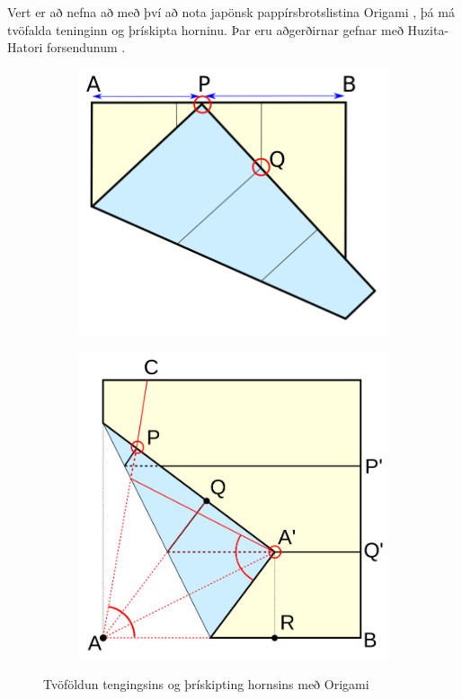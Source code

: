 \begin{frame}
  Vert er að nefna að með því að nota japönsk pappírsbrotslistina
  Origami \cite{WikiOrigami}, þá má tvöfalda
  teninginn og þrískipta horninu. Þar eru aðgerðirnar gefnar með
  Huzita-Hatori forsendunum \cite{WikiHuzita}.
  \begin{figure}[H]
    \centering
    \begin{subfigure}[]{0.4\textwidth}
      \includegraphics[width=\textwidth]{CubeDoublingOrigami}
    \end{subfigure}
    \begin{subfigure}[]{0.4\textwidth}
      \includegraphics[width=\textwidth]{AngleTrisectionOrigami}
    \end{subfigure}
    \caption{Tvöföldun tengingsins og þrískipting hornsins með Origami}
    \label{fig:origami}
  \end{figure}
  
\end{frame}


